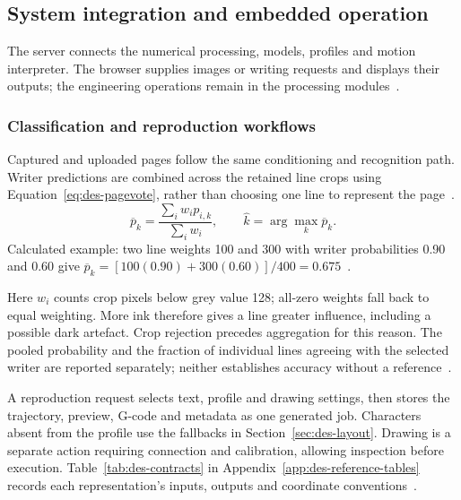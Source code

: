 \subsection{System integration and embedded operation}
\label{sec:des-integration}
The server connects the numerical processing, models, profiles and motion interpreter. The browser supplies images or writing requests and displays their outputs; the engineering operations remain in the processing modules~\cite[web/server.py]{braunepipeline2026}.

\subsubsection{Classification and reproduction workflows}
Captured and uploaded pages follow the same conditioning and recognition path. Writer predictions are combined across the retained line crops using Equation~\ref{eq:des-pagevote}, rather than choosing one line to represent the page~\cite[web/server.py, NameWriter]{braunepipeline2026}.
\begin{equation}
\overline p_k=\frac{\sum_i w_i p_{i,k}}{\sum_i w_i},\qquad
\widehat k=\arg\max_k\overline p_k.
\label{eq:des-pagevote}
\end{equation}
Calculated example: two line weights 100 and 300 with writer probabilities 0.90 and 0.60 give $\overline p_k=[100(0.90)+300(0.60)]/400=0.675$~\cite[web/server.py, NameWriter]{braunepipeline2026}.

Here $w_i$ counts crop pixels below grey value 128; all-zero weights fall back to equal weighting. More ink therefore gives a line greater influence, including a possible dark artefact. Crop rejection precedes aggregation for this reason. The pooled probability and the fraction of individual lines agreeing with the selected writer are reported separately; neither establishes accuracy without a reference~\cite[web/server.py, NameWriter]{braunepipeline2026}.

A reproduction request selects text, profile and drawing settings, then stores the trajectory, preview, G-code and metadata as one generated job. Characters absent from the profile use the fallbacks in Section~\ref{sec:des-layout}. Drawing is a separate action requiring connection and calibration, allowing inspection before execution. Table~\ref{tab:des-contracts} in Appendix~\ref{app:des-reference-tables} records each representation's inputs, outputs and coordinate conventions~\cite[web/server.py; reproduce.py, WriteGcode]{braunepipeline2026}.

